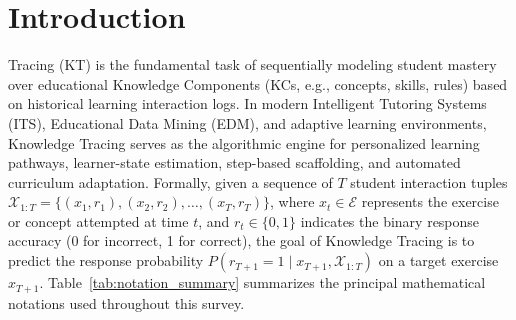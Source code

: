 \documentclass[journal]{IEEEtran}
\begin{document}
\section{Introduction}
\label{sec:intro}

 Tracing (KT) is the fundamental task of sequentially modeling student mastery over educational Knowledge Components (KCs, e.g., concepts, skills, rules) based on historical learning interaction logs. In modern Intelligent Tutoring Systems (ITS), Educational Data Mining (EDM), and adaptive learning environments, Knowledge Tracing serves as the algorithmic engine for personalized learning pathways, learner-state estimation, step-based scaffolding, and automated curriculum adaptation. Formally, given a sequence of $T$ student interaction tuples $\mathcal{X}_{1:T} = \{(x_1, r_1), (x_2, r_2), \dots, (x_T, r_T)\}$, where $x_t \in \mathcal{E}$ represents the exercise or concept attempted at time $t$, and $r_t \in \{0, 1\}$ indicates the binary response accuracy (0 for incorrect, 1 for correct), the goal of Knowledge Tracing is to predict the response probability $P(r_{T+1} = 1 \mid x_{T+1}, \mathcal{X}_{1:T})$ on a target exercise $x_{T+1}$. Table~\ref{tab:notation_summary} summarizes the principal mathematical notations used throughout this survey.

\begin{table}[t]
\caption{Summary of Key Mathematical Notations}
\label{tab:notation_summary}
\centering
{}
\end{table}
\end{document}
